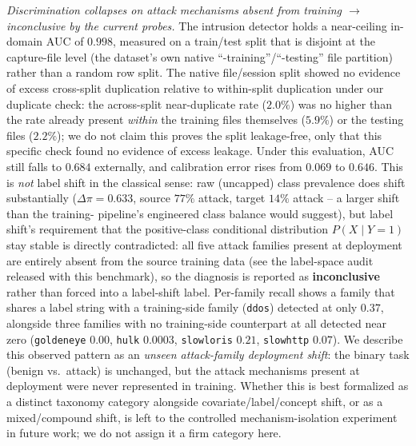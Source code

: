 \documentclass[11pt]{article}
\begin{document}
\emph{Discrimination collapses on attack mechanisms absent from training $\rightarrow$
inconclusive by the current probes.} The intrusion detector holds a near-ceiling in-domain AUC of
$0.998$, measured on a train/test split that is disjoint at the capture-file level (the dataset's
own native ``-training''/``-testing'' file partition) rather than a random row split. The native
file/session split showed no evidence of excess cross-split duplication relative to within-split
duplication under our duplicate check: the across-split near-duplicate rate ($2.0\%$) was no
higher than the rate already present \emph{within} the training files themselves ($5.9\%$) or the
testing files ($2.2\%$); we do not claim this proves the split leakage-free, only that this
specific check found no evidence of excess leakage. Under this evaluation, AUC still falls to $0.684$
externally, and calibration error rises from $0.069$ to $0.646$. This is \emph{not} label shift in
the classical sense: raw (uncapped) class prevalence does shift substantially
($\Delta\pi=0.633$, source $77\%$ attack, target $14\%$ attack -- a larger shift than the training-
pipeline's engineered class balance would suggest), but label shift's requirement that the
positive-class conditional distribution $P(X\mid Y{=}1)$ stay stable is directly contradicted: all
five attack families present at deployment are entirely absent from the source training data (see
the label-space audit released with this benchmark), so the diagnosis is reported as
\textbf{inconclusive} rather than forced into a label-shift label. Per-family recall shows a family
that shares a label string with a training-side family (\texttt{ddos}) detected at only $0.37$,
alongside three families with no training-side counterpart at all detected near zero
(\texttt{goldeneye} $0.00$, \texttt{hulk} $0.0003$, \texttt{slowloris} $0.21$,
\texttt{slowhttp} $0.07$). We describe this observed pattern as an \emph{unseen attack-family
deployment shift}: the binary task (benign vs.\ attack) is unchanged, but the attack mechanisms
present at deployment were never represented in training. Whether this is best formalized as a
distinct taxonomy category alongside covariate/label/concept shift, or as a mixed/compound shift,
is left to the controlled mechanism-isolation experiment in future work; we do not assign it a
firm category here.
\end{document}
